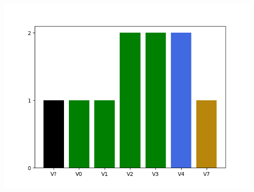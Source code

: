 


































\raggedcolumns
\begin{multicols}{2}

\includegraphics[width=\linewidth]{./maps/plots//Quartzville Creek.png}
\end{multicols}
